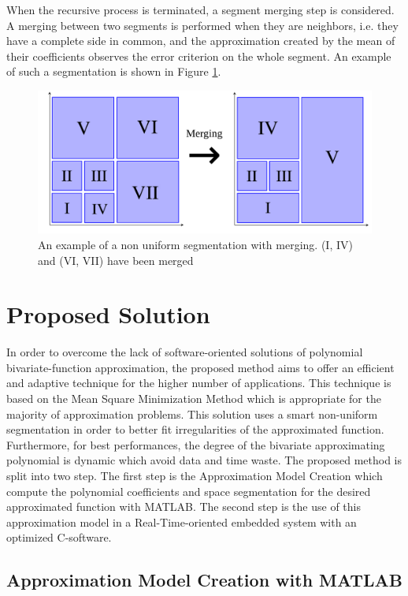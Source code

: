 \documentclass[fleqn,10pt]{SelfArx} %
\begin{document}
When the recursive process is terminated, a segment merging step is considered. A merging between two segments is performed when they are neighbors, i.e. they have a complete side in common, and the approximation created by the mean of their coefficients observes the error criterion on the whole segment.
An example of such a segmentation is shown in Figure \ref{merging}.

\begin{figure}[h]
    \centering
    \includegraphics[width=\columnwidth]{graphics/merging.png}
    \caption{An example of a non uniform segmentation with merging. (I, IV) and (VI, VII) have been merged}
    \label{merging}
\end{figure}

\section{Proposed Solution}
In order to overcome the lack of software-oriented solutions of polynomial bivariate-function approximation, 
the proposed method aims to offer an efficient and adaptive technique for the higher number of applications. This technique is based on 
the Mean Square Minimization Method which is appropriate for the majority of approximation problems.
This solution uses a smart non-uniform segmentation in order to better fit irregularities of the approximated function.
Furthermore, for best performances, the degree of the bivariate approximating polynomial is dynamic which avoid data and time waste.
The proposed method is split into two step. The first step is the Approximation Model Creation which compute the polynomial coefficients and space segmentation for the desired approximated function with MATLAB. The second step is the use of this approximation model in a Real-Time-oriented embedded system with an optimized C-software.

\subsection{Approximation Model Creation with MATLAB}
\end{document}
